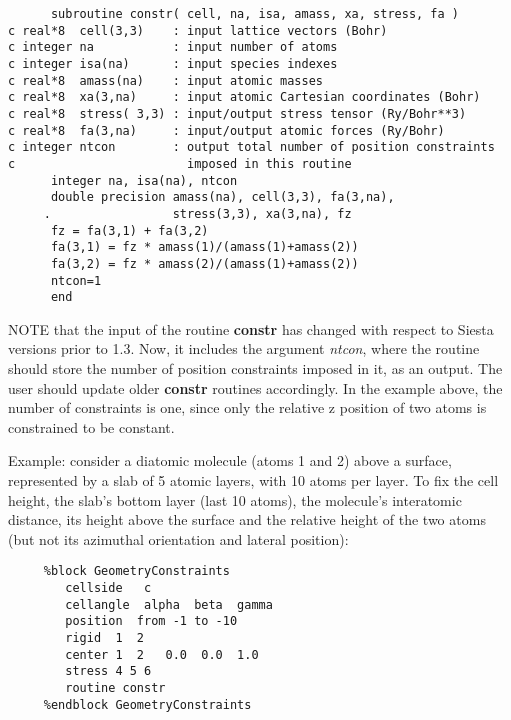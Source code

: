\documentclass[11pt]{article}
\begin{document}
\begin{description}
\begin{itemize}
\begin{verbatim}
      subroutine constr( cell, na, isa, amass, xa, stress, fa )
c real*8  cell(3,3)    : input lattice vectors (Bohr)
c integer na           : input number of atoms
c integer isa(na)      : input species indexes
c real*8  amass(na)    : input atomic masses
c real*8  xa(3,na)     : input atomic Cartesian coordinates (Bohr)
c real*8  stress( 3,3) : input/output stress tensor (Ry/Bohr**3)
c real*8  fa(3,na)     : input/output atomic forces (Ry/Bohr)
c integer ntcon        : output total number of position constraints
c                        imposed in this routine
      integer na, isa(na), ntcon
      double precision amass(na), cell(3,3), fa(3,na),
     .                 stress(3,3), xa(3,na), fz
      fz = fa(3,1) + fa(3,2)
      fa(3,1) = fz * amass(1)/(amass(1)+amass(2))
      fa(3,2) = fz * amass(2)/(amass(1)+amass(2))
      ntcon=1
      end
\end{verbatim}

NOTE that the input of the routine {\bf constr} has changed
with respect to {\sc Siesta} versions prior to 1.3. Now, it includes the
argument {\it ntcon}, where the routine should
store the number of position constraints imposed in it,
as an output.  The user should update older {\bf constr} routines
accordingly. In the example above, the number of constraints is one,
since only the relative z position of two atoms is constrained
to be constant.

\end{itemize}

Example: consider a diatomic molecule (atoms 1 and 2) above a surface,
represented by a slab of 5 atomic layers, with 10 atoms per layer.
To fix the cell height, the slab's bottom layer (last 10 atoms),
the molecule's interatomic distance, its height above the surface and
the relative height of the two atoms
(but not its azimuthal orientation and lateral position):

\begin{verbatim}
     %block GeometryConstraints
        cellside   c
        cellangle  alpha  beta  gamma
        position  from -1 to -10
        rigid  1  2
        center 1  2   0.0  0.0  1.0
        stress 4 5 6
        routine constr
     %endblock GeometryConstraints
\end{verbatim}


\end{description}
\end{document}
